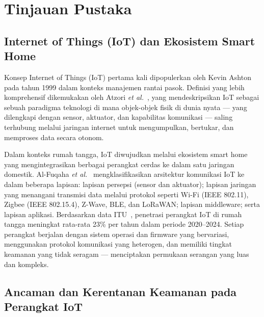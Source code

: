 
\section{Tinjauan Pustaka}

\subsection{Internet of Things (IoT) dan Ekosistem Smart Home}
Konsep Internet of Things (IoT) pertama kali dipopulerkan oleh Kevin Ashton
pada tahun 1999 dalam konteks manajemen rantai pasok. Definisi yang lebih
komprehensif dikemukakan oleh Atzori \textit{et al.}~\cite{b5}, yang
mendeskripsikan IoT sebagai sebuah paradigma teknologi di mana objek-objek
fisik di dunia nyata --- yang dilengkapi dengan sensor, aktuator, dan
kapabilitas komunikasi --- saling terhubung melalui jaringan internet untuk
mengumpulkan, bertukar, dan memproses data secara otonom.

Dalam konteks rumah tangga, IoT diwujudkan melalui ekosistem smart home yang
mengintegrasikan berbagai perangkat cerdas ke dalam satu jaringan domestik.
Al-Fuqaha \textit{et al.}~\cite{b6} mengklasifikasikan arsitektur komunikasi
IoT ke dalam beberapa lapisan: lapisan persepsi (sensor dan aktuator); lapisan
jaringan yang menangani transmisi data melalui protokol seperti Wi-Fi (IEEE
802.11), Zigbee (IEEE 802.15.4), Z-Wave, BLE, dan LoRaWAN; lapisan middleware;
serta lapisan aplikasi. Berdasarkan data ITU~\cite{b7}, penetrasi perangkat IoT
di rumah tangga meningkat rata-rata 23\% per tahun dalam periode 2020--2024.
Setiap perangkat berjalan dengan sistem operasi dan firmware yang bervariasi,
menggunakan protokol komunikasi yang heterogen, dan memiliki tingkat keamanan
yang tidak seragam --- menciptakan permukaan serangan yang luas dan kompleks.

\subsection{Ancaman dan Kerentanan Keamanan pada Perangkat IoT}

